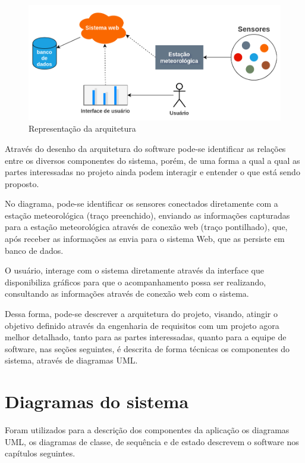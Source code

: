 \begin{center}
\begin{figure}[H]
    \centering
    \caption{Representação da arquitetura} \label{fig:figure_arq_macro}
    \includegraphics[scale=0.43]{diagrams/arq_macro.png}
    \hfill
{}
\end{figure}
\end{center}

Através do desenho da arquitetura do software pode-se identificar as relações entre os diversos componentes do sistema, porém, de uma forma a qual a qual as partes interessadas no projeto ainda podem interagir e entender o que está sendo proposto.

No diagrama, pode-se identificar os sensores conectados diretamente com a estação meteorológica (traço preenchido), enviando as informações capturadas para a estação meteorológica através de conexão web (traço pontilhado), que, após receber as informações as envia para o sistema Web, que as persiste em banco de dados.

O usuário, interage com o sistema diretamente através da interface que disponibiliza gráficos para que o acompanhamento possa ser realizando, consultando as informações através de conexão web com o sistema.

Dessa forma, pode-se descrever a arquitetura do projeto, visando, atingir o objetivo definido através da engenharia de requisitos com um projeto agora melhor detalhado, tanto para as partes interessadas, quanto para a equipe de software, nas seções seguintes, é descrita de forma técnicas os componentes do sistema, através de diagramas UML.

\chapter{Diagramas do sistema}

Foram utilizados para a descrição dos componentes da aplicação os diagramas UML, os diagramas de classe, de sequência e de estado descrevem o software nos capítulos seguintes.

